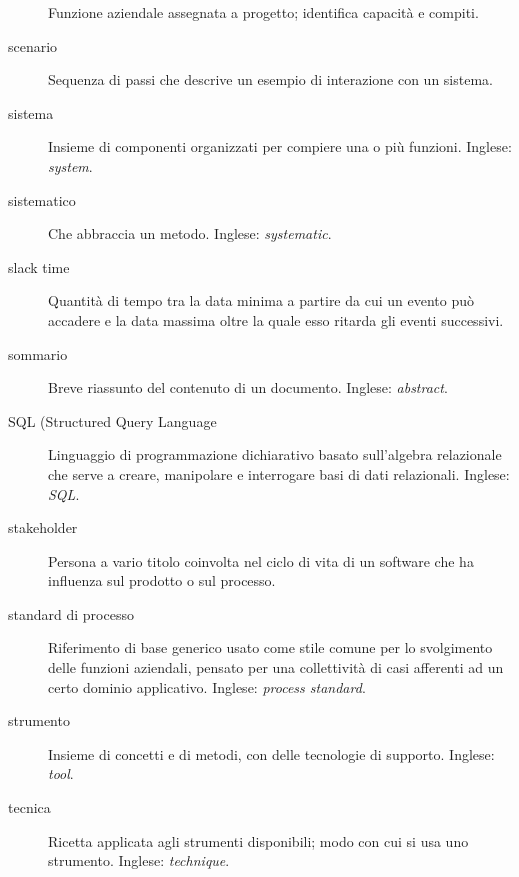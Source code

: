 \documentclass[a4paper]{article}
\begin{document}
\begin{description}
			Funzione aziendale assegnata a progetto; identifica capacità e compiti.
			
	\item[scenario] 

			Sequenza di passi che descrive un esempio di interazione con un sistema.
			
	\item[sistema] 

			Insieme di componenti organizzati per compiere una o più funzioni. Inglese: \emph{system}.
			
	\item[sistematico] 

			Che abbraccia un metodo. Inglese: \emph{systematic}.
			
	\item[slack time] 

			Quantità di tempo tra la data minima a partire da cui un evento può accadere e la data massima oltre la quale esso ritarda gli eventi successivi.
			
	\item[sommario] 

			Breve riassunto del contenuto di un documento. Inglese: \emph{abstract}.
			
	\item[SQL (Structured Query Language] 

			Linguaggio di programmazione dichiarativo basato sull'algebra relazionale che serve a creare, manipolare e interrogare basi di dati relazionali. Inglese: \emph{SQL}.
			
	\item[stakeholder] 

			Persona a vario titolo coinvolta nel ciclo di vita di un software che ha influenza sul prodotto o sul processo.
			
	\item[standard di processo] 

			Riferimento di base generico usato come stile comune per lo svolgimento delle funzioni aziendali, pensato per una collettività di casi afferenti ad un certo dominio applicativo. Inglese: \emph{process standard}.
			
	\item[strumento] 

			Insieme di concetti e di metodi, con delle tecnologie di supporto. Inglese: \emph{tool}.
			
	\item[tecnica] 

			Ricetta applicata agli strumenti disponibili; modo con cui si usa uno strumento. Inglese: \emph{technique}.
			

\end{description}
\end{document}
